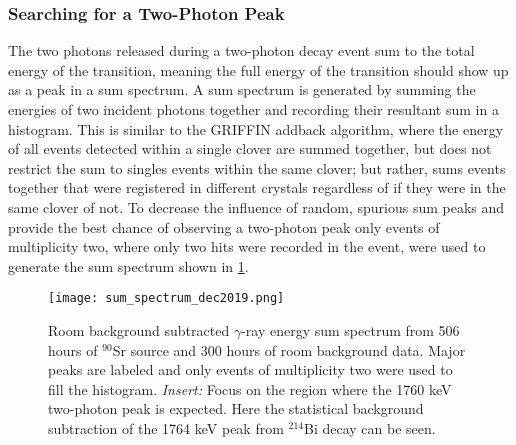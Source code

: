 \documentclass[cnatzke_thesis_proposal.tex]{subfiles}
\begin{document}
\subsubsection{Searching for a Two-Photon Peak}

The two photons released during a two-photon decay event sum to the total energy of the transition, meaning the full energy of the transition should show up as a peak in a sum spectrum. 
A sum spectrum is generated by summing the energies of two incident photons together and recording their resultant sum in a histogram.
This is similar to the GRIFFIN addback algorithm, where the energy of all events detected within a single clover are summed together, but does not restrict the sum to singles events within the same clover; but rather, sums events together that were registered in different crystals regardless of if they were in the same clover of not. 
To decrease the influence of random, spurious sum peaks and provide the best chance of observing a two-photon peak only events of multiplicity two, where only two hits were recorded in the event, were used to generate the sum spectrum shown in \ref{fig:sum_spectrum_dec2019}.

\begin{figure}[htbp]
  \centering
  \texttt{[image: sum\_spectrum\_dec2019.png]}
  \caption{Room background subtracted $\gamma$-ray energy sum spectrum from 506 hours of $^{90}$Sr source and 300 hours of room background data. Major peaks are labeled and only events of multiplicity two were used to fill the histogram. \textit{Insert:} Focus on the region where the 1760 keV two-photon peak is expected. Here the statistical background subtraction of the 1764 keV peak from $^{214}$Bi decay can be seen.}
  \label{fig:sum_spectrum_dec2019}
\end{figure}




\end{document}
